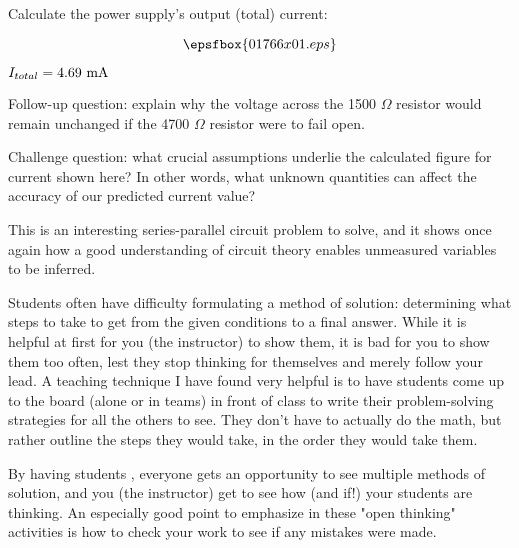 

Calculate the power supply's output (total) current:

$$\epsfbox{01766x01.eps}$$







$I_{total} = 4.69 \hbox{ mA}$

\vskip 10pt

Follow-up question: explain why the voltage across the 1500 $\Omega$ resistor would remain unchanged if the 4700 $\Omega$ resistor were to fail open.

\vskip 10pt

Challenge question: what crucial assumptions underlie the calculated figure for current shown here?  In other words, what unknown quantities can affect the accuracy of our predicted current value?







This is an interesting series-parallel circuit problem to solve, and it shows once again how a good understanding of circuit theory enables unmeasured variables to be inferred.

\vskip 10pt

Students often have difficulty formulating a method of solution: determining what steps to take to get from the given conditions to a final answer.  While it is helpful at first for you (the instructor) to show them, it is bad for you to show them too often, lest they stop thinking for themselves and merely follow your lead.  A teaching technique I have found very helpful is to have students come up to the board (alone or in teams) in front of class to write their problem-solving strategies for all the others to see.  They don't have to actually do the math, but rather outline the steps they would take, in the order they would take them.

By having students , everyone gets an opportunity to see multiple methods of solution, and you (the instructor) get to see how (and if!) your students are thinking.  An especially good point to emphasize in these "open thinking" activities is how to check your work to see if any mistakes were made.




